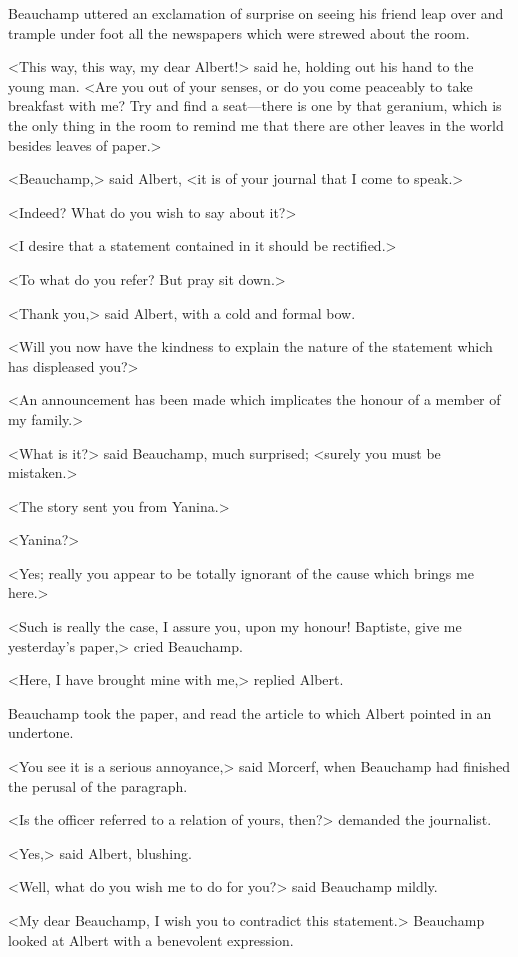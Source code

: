  Beauchamp uttered an exclamation of surprise on seeing his friend leap over and trample under foot all the newspapers which were strewed about the room. 

 <This way, this way, my dear Albert!> said he, holding out his hand to the young man. <Are you out of your senses, or do you come peaceably to take breakfast with me? Try and find a seat—there is one by that geranium, which is the only thing in the room to remind me that there are other leaves in the world besides leaves of paper.> 

 <Beauchamp,> said Albert, <it is of your journal that I come to speak.> 

 <Indeed? What do you wish to say about it?> 

 <I desire that a statement contained in it should be rectified.> 

 <To what do you refer? But pray sit down.> 

 <Thank you,> said Albert, with a cold and formal bow. 

 <Will you now have the kindness to explain the nature of the statement which has displeased you?> 

 <An announcement has been made which implicates the honour of a member of my family.> 

 <What is it?> said Beauchamp, much surprised; <surely you must be mistaken.> 

 <The story sent you from Yanina.> 

 <Yanina?> 

 <Yes; really you appear to be totally ignorant of the cause which brings me here.> 

 <Such is really the case, I assure you, upon my honour! Baptiste, give me yesterday's paper,> cried Beauchamp. 

 <Here, I have brought mine with me,> replied Albert. 

 Beauchamp took the paper, and read the article to which Albert pointed in an undertone. 

 <You see it is a serious annoyance,> said Morcerf, when Beauchamp had finished the perusal of the paragraph. 

 <Is the officer referred to a relation of yours, then?> demanded the journalist. 

 <Yes,> said Albert, blushing. 

 <Well, what do you wish me to do for you?> said Beauchamp mildly. 

 <My dear Beauchamp, I wish you to contradict this statement.> Beauchamp looked at Albert with a benevolent expression. 

